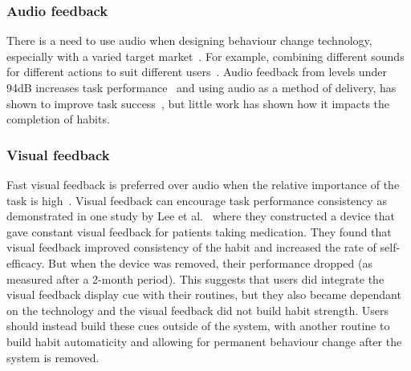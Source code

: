 \documentclass{scaffold/sigchi}
\begin{document}
\subsubsection{Audio feedback}
There is a need to use audio when designing behaviour change technology, especially with a varied target market~\cite{article_designing_for_health_behaviour_change_hci}. For example, combining different sounds for different actions to suit different users~\cite{article_movipill_improving_medication_elders}. Audio feedback from levels under 94dB increases task performance~\cite{high_audio_feedback_negative_performance} and using audio as a method of delivery, has shown to improve task success~\cite{auditory_notifications_increase_delivery_success}, but little work has shown how it impacts the completion of habits.

\subsubsection{Visual feedback}
Fast visual feedback is preferred over audio when the relative importance of the task is high~\cite{visual_mode_better}. Visual feedback can encourage task performance consistency as demonstrated in one study by Lee et al.~\cite{article_realtime_feedback_improving_medication_taking} where they constructed a device that gave constant visual feedback for patients taking medication. They found that visual feedback improved consistency of the habit and increased the rate of self-efficacy. But when the device was removed, their performance dropped (as measured after a 2-month period). This suggests that users did integrate the visual feedback display cue with their routines, but they also became dependant on the technology and the visual feedback did not build habit strength. Users should instead build these cues outside of the system, with another routine to build habit automaticity and allowing for permanent behaviour change after the system is removed.
\end{document}
